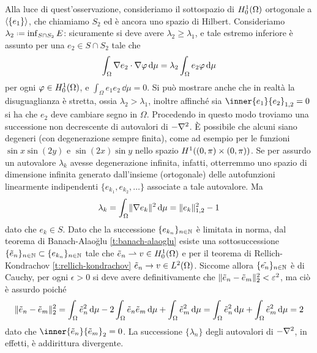 Alla luce di quest'osservazione, consideriamo il sottospazio di $\sobHc[1]{\Omega}$ ortogonale a $\gen{\{e_1\}}$, che chiamiamo $S_2$ ed è ancora uno spazio di Hilbert.
Consideriamo $\lambda_2\defeq\inf_{S\cap S_2}E$: sicuramente si deve avere $\lambda_2\ge\lambda_1$, e tale estremo inferiore è assunto per una $e_2\in S\cap S_2$ tale che
\begin{equation}
    \int_\Omega\scalar{\grad e_2}{\grad\phi}\,\dd\mu=\lambda_2\int_\Omega e_2\phi\,\dd\mu
\end{equation}
per ogni $\phi\in\sobHc[1]{\Omega}$, e $\int_\Omega e_1e_2\,\dd\mu=0$.
Si può mostrare anche che in realtà la disuguaglianza è stretta, ossia $\lambda_2>\lambda_1$, inoltre affinch\'e sia $\inner{e_1}{e_2}_{1,2}=0$ si ha che $e_2$ deve cambiare segno in $\Omega$.
Procedendo in questo modo troviamo una successione non decrescente di autovalori di $-\lap$.
È possibile che alcuni siano degeneri (con degenerazione sempre finita), come ad esempio per le funzioni $\sin x\sin(2y)$ e $\sin(2x)\sin y$ nello spazio $\sobH[1]{(0,\pi)\times(0,\pi)}$.
Se per assurdo un autovalore $\lambda_k$ avesse degenerazione infinita, infatti, otterremmo uno spazio di dimensione infinita generato dall'insieme (ortogonale) delle autofunzioni linearmente indipendenti $\{e_{k_1},e_{k_2},\dotsc\}$ associate a tale autovalore.
Ma
\begin{equation}
    \lambda_k=\int_\Omega\norm{\grad e_k}^2\,\dd\mu=\norm{e_k}_{1,2}^2-1
\end{equation}
dato che $e_k\in S$.
Dato che la successione $\{e_{k_n}\}_{n\in\N}$ è limitata in norma, dal teorema di Banach-Alao\u{g}lu \ref{t:banach-alaoglu} esiste una sottosuccessione $\{\tilde{e}_n\}_{n\in\N}\subset\{e_{k_n}\}_{n\in\N}$ tale che $\tilde{e}_n\weakto v\in\sobHc[1]{\Omega}$ e per il teorema di Rellich-Kondrachov \ref{t:rellich-kondrachov} $\tilde{e}_n\to v\in\leb[2]{\Omega}$.
Siccome allora $\{\tilde{e_n}\}_{n\in\N}$ è di Cauchy, per ogni $\epsilon>0$ si deve avere definitivamente che $\norm{\tilde{e}_n-\tilde{e}_m}_2^2<\epsilon^2$, ma ciò è assurdo poich\'e
\begin{equation}
    \norm{\tilde{e}_n-\tilde{e}_m}_2^2=
    \int_\Omega\tilde{e}_n^2\,\dd\mu-2\int_\Omega\tilde{e}_n\tilde{e}_m\,\dd\mu+\int_\Omega\tilde{e}_m^2\,\dd\mu=
    \int_\Omega\tilde{e}_n^2\,\dd\mu+\int_\Omega\tilde{e}_m^2\,\dd\mu=
    2
\end{equation}
dato che $\inner{\tilde{e}_n}{\tilde{e}_m}_2=0$.
La successione $\{\lambda_n\}$ degli autovalori di $-\lap$, in effetti, è addirittura divergente.

